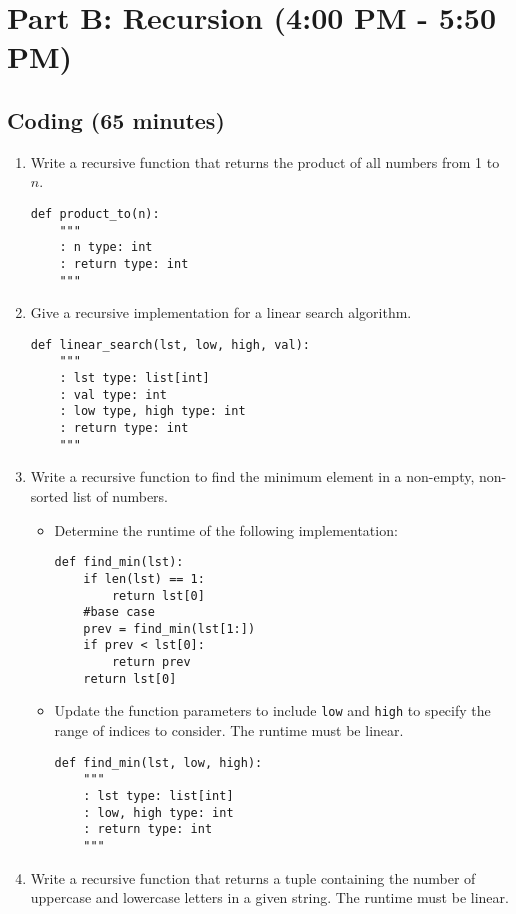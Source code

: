 \documentclass{article}
\begin{document}
\section*{Part B: Recursion (4:00 PM - 5:50 PM)}

\subsection*{Coding (65 minutes)}

\begin{enumerate}
    \item Write a recursive function that returns the product of all numbers from 1 to $n$.
    \begin{verbatim}
def product_to(n):
    """
    : n type: int
    : return type: int
    """
    \end{verbatim}
    \item Give a recursive implementation for a linear search algorithm.
    \begin{verbatim}
def linear_search(lst, low, high, val):
    """
    : lst type: list[int]
    : val type: int
    : low type, high type: int
    : return type: int
    """
    \end{verbatim}
    \item Write a recursive function to find the minimum element in a non-empty, non-sorted list of numbers.
    \begin{itemize}
        \item Determine the runtime of the following implementation:
        \begin{verbatim}
def find_min(lst):
    if len(lst) == 1:
        return lst[0]
    #base case
    prev = find_min(lst[1:])
    if prev < lst[0]:
        return prev
    return lst[0]
        \end{verbatim}
        \item Update the function parameters to include \texttt{low} and \texttt{high} to specify the range of indices to consider. The runtime must be linear.
        \begin{verbatim}
def find_min(lst, low, high):
    """
    : lst type: list[int]
    : low, high type: int
    : return type: int
    """
    \end{verbatim}
    \end{itemize}
    \item Write a recursive function that returns a tuple containing the number of uppercase and lowercase letters in a given string. The runtime must be linear.
    \begin{verbatim}

\end{verbatim}
\end{enumerate}
\end{document}
